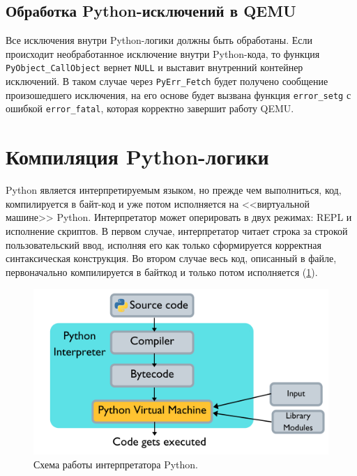 \subsection{Обработка Python-исключений в QEMU}\label{sec:ch2/sec2/sub5/sub1}

Все исключения внутри Python-логики должны быть обработаны. Если происходит
необработанное исключение внутри Python-кода, то функция \texttt{PyObject\_CallObject}
вернет \texttt{NULL} и выставит внутренний контейнер исключений.
В таком случае через \texttt{PyErr\_Fetch} будет получено сообщение произошедшего исключения,
на его основе будет вызвана функция \texttt{error\_setg} с ошибкой \texttt{error\_fatal},
которая корректно завершит работу QEMU.

\section{Компиляция Python-логики}\label{sec:ch2/sec3}

Python является интерпретируемым языком, но прежде чем выполниться,
код, компилируется в байт-код и уже потом исполняется на <<виртуальной машине>> Python.
Интерпретатор может оперировать в двух режимах: REPL и исполнение скриптов.
В первом случае, интерпретатор читает строка за строкой пользовательский
ввод, исполняя его как только сформируется корректная синтаксическая конструкция.
Во втором случае весь код, описанный в файле, первоначально компилируется в байткод и только потом исполняется
(\cref{fig:python-interpreter}).

\begin{figure}[!htbp]
    \centering
    \begin{adjustbox}{max totalsize={0.8\textwidth}{\textheight}}
        \includegraphics[]{images/python-interpreter.png}
    \end{adjustbox}
    \caption{Схема работы интерпретатора Python.}\label{fig:python-interpreter}
\end{figure}

